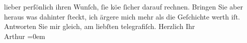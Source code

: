 \begin{ledgroupsized}[t]{13cm}
               lieber perſönlich ihren Wunſch, ſie kö{\geminationn}e ſicher darauf
               rechnen. {\pb}Bringen Sie aber heraus was dahinter
               ſteckt, ich ärgere mich mehr als die Geſchichte werth iſt. Antworten Sie mir gleich,
               am liebſten telegrafiſch.\pend
           \pstart
           Herzlich Ihr{\\[\baselineskip]}\spacefill\mbox{Arthur}\pend
           \leftskip=0em{}\endnumbering{}\end{ledgroupsized}  \newcommand{\dateiname}{L00712}\newcommand{\titel}{Arthur Schnitzler an Richard Beer-Hofmann, 4. 8. 1897}\newcommand{\editorInnen}{Martin Anton Müller und Gerd-Hermann Susen}
            \footnotesize
\begin{ledgroupsized}[t]{11.5cm}
\end{ledgroupsized}
         
      